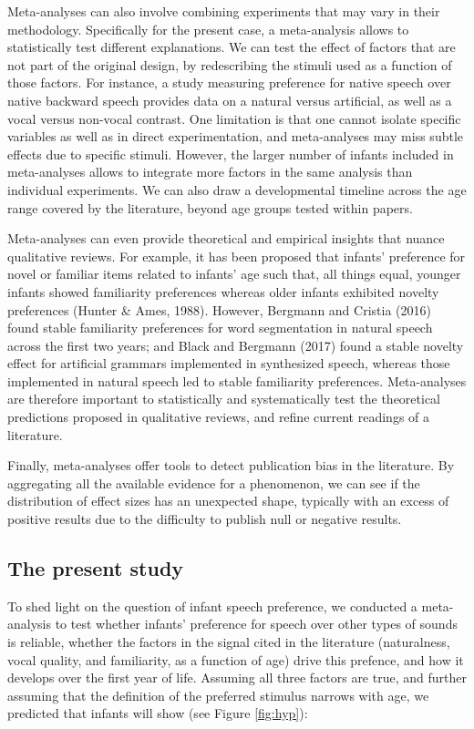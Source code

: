 \documentclass[man]{apa6}
\begin{document}
Meta-analyses can also involve combining experiments that may vary in
their methodology. Specifically for the present case, a meta-analysis
allows to statistically test different explanations. We can test the
effect of factors that are not part of the original design, by
redescribing the stimuli used as a function of those factors. For
instance, a study measuring preference for native speech over native
backward speech provides data on a natural versus artificial, as well as
a vocal versus non-vocal contrast. One limitation is that one cannot
isolate specific variables as well as in direct experimentation, and
meta-analyses may miss subtle effects due to specific stimuli. However,
the larger number of infants included in meta-analyses allows to
integrate more factors in the same analysis than individual experiments.
We can also draw a developmental timeline across the age range covered
by the literature, beyond age groups tested within papers.

Meta-analyses can even provide theoretical and empirical insights that
nuance qualitative reviews. For example, it has been proposed that
infants' preference for novel or familiar items related to infants' age
such that, all things equal, younger infants showed familiarity
preferences whereas older infants exhibited novelty preferences (Hunter
\& Ames, 1988). However, Bergmann and Cristia (2016) found stable
familiarity preferences for word segmentation in natural speech across
the first two years; and Black and Bergmann (2017) found a stable
novelty effect for artificial grammars implemented in synthesized
speech, whereas those implemented in natural speech led to stable
familiarity preferences. Meta-analyses are therefore important to
statistically and systematically test the theoretical predictions
proposed in qualitative reviews, and refine current readings of a
literature.

Finally, meta-analyses offer tools to detect publication bias in the
literature. By aggregating all the available evidence for a phenomenon,
we can see if the distribution of effect sizes has an unexpected shape,
typically with an excess of positive results due to the difficulty to
publish null or negative results.

\subsection{The present study}\label{the-present-study}

To shed light on the question of infant speech preference, we conducted
a meta-analysis to test whether infants' preference for speech over
other types of sounds is reliable, whether the factors in the signal
cited in the literature (naturalness, vocal quality, and familiarity, as
a function of age) drive this prefence, and how it develops over the
first year of life. Assuming all three factors are true, and further
assuming that the definition of the preferred stimulus narrows with age,
we predicted that infants will show (see Figure \ref{fig:hyp}):
\end{document}
